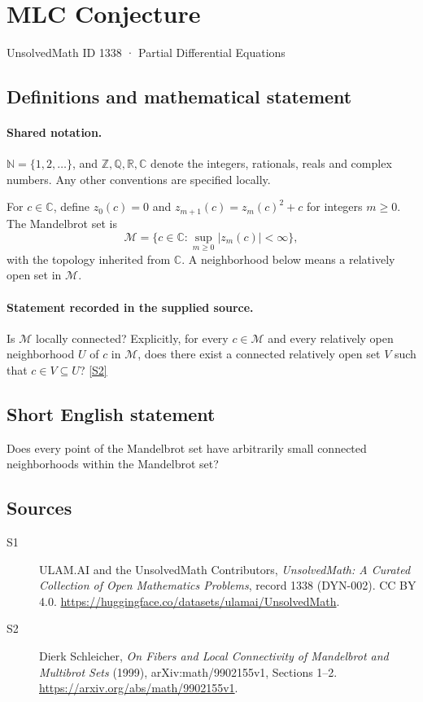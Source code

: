 \documentclass[11pt]{article}
\newcommand{\sref}[2]{\hyperlink{source:#1:#2}{[S#2]}}
\begin{document}
\setcounter{section}{1337}
\section{MLC Conjecture}\label{1338}
{\small\sffamily UnsolvedMath ID 1338 · Partial Differential Equations}
\subsection{Definitions and mathematical statement}

\paragraph{Shared notation.}$\mathbb N=\{1,2,\ldots\}$, and $\mathbb Z,\mathbb Q,\mathbb R,\mathbb C$ denote the integers, rationals, reals and complex numbers. Any other conventions are specified locally.


For $c\in\mathbb C$, define $z_0(c)=0$ and $z_{m+1}(c)=z_m(c)^2+c$ for integers $m\ge0$. The Mandelbrot set is
\[
 \mathcal M=\{c\in\mathbb C:\sup_{m\ge0}|z_m(c)|<\infty\},
\]
with the topology inherited from $\mathbb C$. A neighborhood below means a relatively open set in $\mathcal M$.
\paragraph{Statement recorded in the supplied source.}
Is $\mathcal M$ locally connected? Explicitly, for every $c\in\mathcal M$ and every relatively open neighborhood $U$ of $c$ in $\mathcal M$, does there exist a connected relatively open set $V$ such that $c\in V\subseteq U$? \sref{1338}{2}
\subsection{Short English statement}
Does every point of the Mandelbrot set have arbitrarily small connected neighborhoods within the Mandelbrot set?
\subsection{Sources}
\begin{description}
\item[\hypertarget{source:1338:1}{S1}] ULAM.AI and the UnsolvedMath Contributors, \emph{UnsolvedMath: A Curated Collection of Open Mathematics Problems}, record 1338 (DYN-002). CC BY 4.0. \url{https://huggingface.co/datasets/ulamai/UnsolvedMath}.
\item[\hypertarget{source:1338:2}{S2}] Dierk Schleicher, \emph{On Fibers and Local Connectivity of Mandelbrot and Multibrot Sets} (1999), arXiv:math/9902155v1, Sections 1--2. \url{https://arxiv.org/abs/math/9902155v1}.
\end{description}
\label{end:1338}
\end{document}
